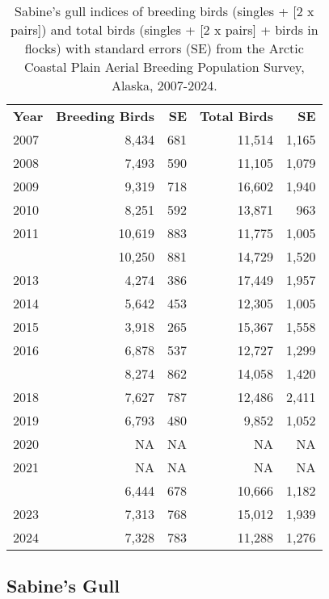 \documentclass[
]{article}
\begin{document}
\begin{longtable}[t]{lrrrr}

\caption{\label{tbl-SAGU}Sabine's gull indices of breeding birds
(singles + {[}2 x pairs{]}) and total birds (singles + {[}2 x pairs{]} +
birds in flocks) with standard errors (SE) from the Arctic Coastal Plain
Aerial Breeding Population Survey, Alaska, 2007-2024.}

\tabularnewline

\\
\toprule
\textbf{Year} & \textbf{Breeding Birds} & \textbf{SE} & \textbf{Total Birds} & \textbf{SE}\\
\midrule
2007 & 8,434 & 681 & 11,514 & 1,165\\
2008 & 7,493 & 590 & 11,105 & 1,079\\
2009 & 9,319 & 718 & 16,602 & 1,940\\
2010 & 8,251 & 592 & 13,871 & 963\\
2011 & 10,619 & 883 & 11,775 & 1,005\\
\addlinespace
2012 & 10,250 & 881 & 14,729 & 1,520\\
2013 & 4,274 & 386 & 17,449 & 1,957\\
2014 & 5,642 & 453 & 12,305 & 1,005\\
2015 & 3,918 & 265 & 15,367 & 1,558\\
2016 & 6,878 & 537 & 12,727 & 1,299\\
\addlinespace
2017 & 8,274 & 862 & 14,058 & 1,420\\
2018 & 7,627 & 787 & 12,486 & 2,411\\
2019 & 6,793 & 480 & 9,852 & 1,052\\
2020 & NA & NA & NA & NA\\
2021 & NA & NA & NA & NA\\
\addlinespace
2022 & 6,444 & 678 & 10,666 & 1,182\\
2023 & 7,313 & 768 & 15,012 & 1,939\\
2024 & 7,328 & 783 & 11,288 & 1,276\\
\bottomrule

\end{longtable}

\endgroup{}

\newpage{}

\subsection*{Sabine's Gull}\label{sabines-gull-2}
\end{document}
